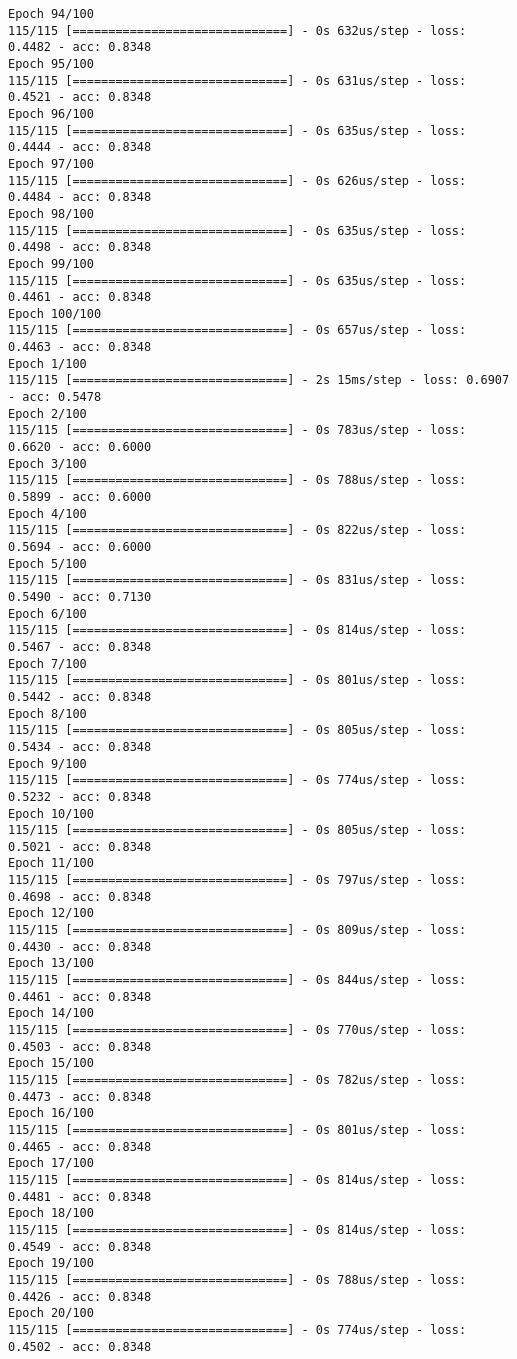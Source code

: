 \documentclass[11pt]{article}
\begin{document}
\begin{Verbatim}[commandchars=\\\{\}]
Epoch 94/100
115/115 [==============================] - 0s 632us/step - loss: 0.4482 - acc: 0.8348
Epoch 95/100
115/115 [==============================] - 0s 631us/step - loss: 0.4521 - acc: 0.8348
Epoch 96/100
115/115 [==============================] - 0s 635us/step - loss: 0.4444 - acc: 0.8348
Epoch 97/100
115/115 [==============================] - 0s 626us/step - loss: 0.4484 - acc: 0.8348
Epoch 98/100
115/115 [==============================] - 0s 635us/step - loss: 0.4498 - acc: 0.8348
Epoch 99/100
115/115 [==============================] - 0s 635us/step - loss: 0.4461 - acc: 0.8348
Epoch 100/100
115/115 [==============================] - 0s 657us/step - loss: 0.4463 - acc: 0.8348
Epoch 1/100
115/115 [==============================] - 2s 15ms/step - loss: 0.6907 - acc: 0.5478
Epoch 2/100
115/115 [==============================] - 0s 783us/step - loss: 0.6620 - acc: 0.6000
Epoch 3/100
115/115 [==============================] - 0s 788us/step - loss: 0.5899 - acc: 0.6000
Epoch 4/100
115/115 [==============================] - 0s 822us/step - loss: 0.5694 - acc: 0.6000
Epoch 5/100
115/115 [==============================] - 0s 831us/step - loss: 0.5490 - acc: 0.7130
Epoch 6/100
115/115 [==============================] - 0s 814us/step - loss: 0.5467 - acc: 0.8348
Epoch 7/100
115/115 [==============================] - 0s 801us/step - loss: 0.5442 - acc: 0.8348
Epoch 8/100
115/115 [==============================] - 0s 805us/step - loss: 0.5434 - acc: 0.8348
Epoch 9/100
115/115 [==============================] - 0s 774us/step - loss: 0.5232 - acc: 0.8348
Epoch 10/100
115/115 [==============================] - 0s 805us/step - loss: 0.5021 - acc: 0.8348
Epoch 11/100
115/115 [==============================] - 0s 797us/step - loss: 0.4698 - acc: 0.8348
Epoch 12/100
115/115 [==============================] - 0s 809us/step - loss: 0.4430 - acc: 0.8348
Epoch 13/100
115/115 [==============================] - 0s 844us/step - loss: 0.4461 - acc: 0.8348
Epoch 14/100
115/115 [==============================] - 0s 770us/step - loss: 0.4503 - acc: 0.8348
Epoch 15/100
115/115 [==============================] - 0s 782us/step - loss: 0.4473 - acc: 0.8348
Epoch 16/100
115/115 [==============================] - 0s 801us/step - loss: 0.4465 - acc: 0.8348
Epoch 17/100
115/115 [==============================] - 0s 814us/step - loss: 0.4481 - acc: 0.8348
Epoch 18/100
115/115 [==============================] - 0s 814us/step - loss: 0.4549 - acc: 0.8348
Epoch 19/100
115/115 [==============================] - 0s 788us/step - loss: 0.4426 - acc: 0.8348
Epoch 20/100
115/115 [==============================] - 0s 774us/step - loss: 0.4502 - acc: 0.8348

\end{Verbatim}
\end{document}
